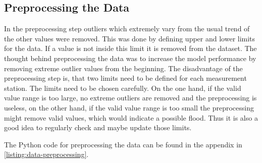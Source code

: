 \subsection{Preprocessing the Data}\label{subsection:data-preprocessing}
In the preprocessing step outliers which extremely vary from the usual trend of the other values were removed. This was done by defining upper and lower limits for the data. If a value is not inside this limit it is removed from the dataset. The thought behind preprocessing the data was to increase the model performance by removing extreme outlier values from the beginning. The disadvantage of the preprocessing step is, that two limits need to be defined for each measurement station. The limits need to be chosen carefully. On the one hand, if the valid value range is too large, no extreme outliers are removed and the preprocessing is useless, on the other hand, if the valid value range is too small the preprocessing might remove valid values, which would indicate a possible flood. Thus it is also a good idea to regularly check and maybe update those limits.
\par
The Python code for preprocessing the data can be found in the appendix in \autoref{listing:data-preprocessing}.

